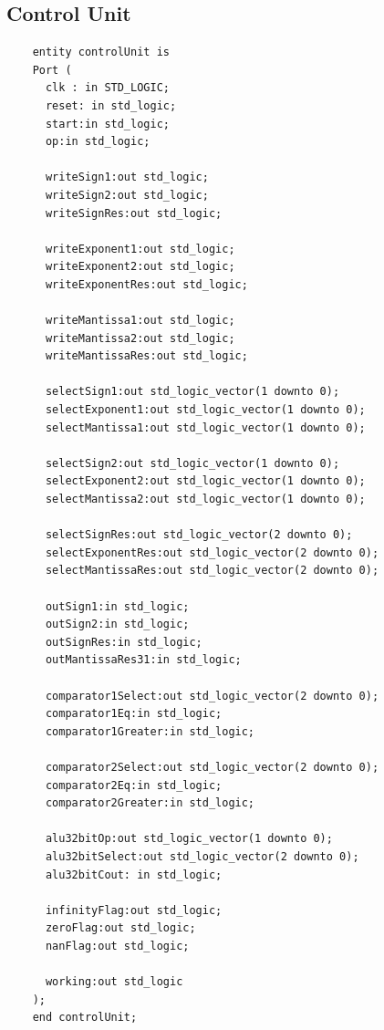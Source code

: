 \documentclass[a4paper,10pt]{article}
\begin{document}
    \subsection{Control Unit}
    \begin{lstlisting}
    entity controlUnit is
    Port (
      clk : in STD_LOGIC;
      reset: in std_logic;
      start:in std_logic;
      op:in std_logic;

      writeSign1:out std_logic;
      writeSign2:out std_logic;
      writeSignRes:out std_logic;

      writeExponent1:out std_logic;
      writeExponent2:out std_logic;
      writeExponentRes:out std_logic;

      writeMantissa1:out std_logic;
      writeMantissa2:out std_logic;
      writeMantissaRes:out std_logic;

      selectSign1:out std_logic_vector(1 downto 0);
      selectExponent1:out std_logic_vector(1 downto 0);
      selectMantissa1:out std_logic_vector(1 downto 0);

      selectSign2:out std_logic_vector(1 downto 0);
      selectExponent2:out std_logic_vector(1 downto 0);
      selectMantissa2:out std_logic_vector(1 downto 0);

      selectSignRes:out std_logic_vector(2 downto 0);
      selectExponentRes:out std_logic_vector(2 downto 0);
      selectMantissaRes:out std_logic_vector(2 downto 0);

      outSign1:in std_logic;
      outSign2:in std_logic;
      outSignRes:in std_logic;
      outMantissaRes31:in std_logic;

      comparator1Select:out std_logic_vector(2 downto 0);
      comparator1Eq:in std_logic;
      comparator1Greater:in std_logic;

      comparator2Select:out std_logic_vector(2 downto 0);
      comparator2Eq:in std_logic;
      comparator2Greater:in std_logic;

      alu32bitOp:out std_logic_vector(1 downto 0);
      alu32bitSelect:out std_logic_vector(2 downto 0);
      alu32bitCout: in std_logic;

      infinityFlag:out std_logic;
      zeroFlag:out std_logic;
      nanFlag:out std_logic;

      working:out std_logic
    );
    end controlUnit;
    \end{lstlisting}

    \newpage
    \label{sec:aluTop}
\end{document}
